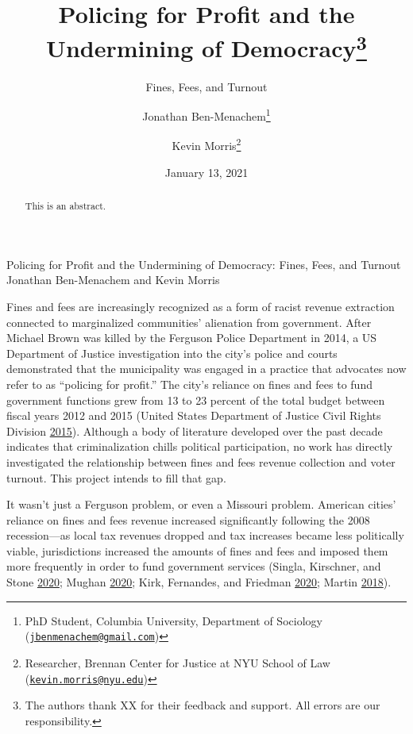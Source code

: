 \documentclass[
  12pt,
]{article}
\title{Policing for Profit and the Undermining of Democracy\thanks{The authors thank XX for their feedback and support. All errors are our responsibility.}}
\subtitle{Fines, Fees, and Turnout}
\author{Jonathan Ben-Menachem\footnote{PhD Student, Columbia University, Department of Sociology (\href{mailto:jbenmenachem@gmail.com}{\nolinkurl{jbenmenachem@gmail.com}})} \and Kevin Morris\footnote{Researcher, Brennan Center for Justice at NYU School of Law (\href{mailto:kevin.morris@nyu.edu}{\nolinkurl{kevin.morris@nyu.edu}})}}
\date{January 13, 2021}
\begin{document}
\maketitle
\begin{abstract}
This is an abstract.
\end{abstract}

\pagebreak

\begin{center}
Policing for Profit and the Undermining of Democracy: Fines, Fees, and Turnout \\
Jonathan Ben-Menachem and Kevin Morris
\end{center}

Fines and fees are increasingly recognized as a form of racist revenue extraction connected to marginalized communities' alienation from government. After Michael Brown was killed by the Ferguson Police Department in 2014, a US Department of Justice investigation into the city's police and courts demonstrated that the municipality was engaged in a practice that advocates now refer to as ``policing for profit.'' The city's reliance on fines and fees to fund government functions grew from 13 to 23 percent of the total budget between fiscal years 2012 and 2015 (United States Department of Justice Civil Rights Division \protect\hyperlink{ref-UnitedStatesDepartmentofJusticeCivilRightsDivision2015}{2015}). Although a body of literature developed over the past decade indicates that criminalization chills political participation, no work has directly investigated the relationship between fines and fees revenue collection and voter turnout. This project intends to fill that gap.

It wasn't just a Ferguson problem, or even a Missouri problem. American cities' reliance on fines and fees revenue increased significantly following the 2008 recession---as local tax revenues dropped and tax increases became less politically viable, jurisdictions increased the amounts of fines and fees and imposed them more frequently in order to fund government services (Singla, Kirschner, and Stone \protect\hyperlink{ref-Singla2020}{2020}; Mughan \protect\hyperlink{ref-Mughan2020}{2020}; Kirk, Fernandes, and Friedman \protect\hyperlink{ref-Kirk2020}{2020}; Martin \protect\hyperlink{ref-Martin2018}{2018}).
\end{document}
